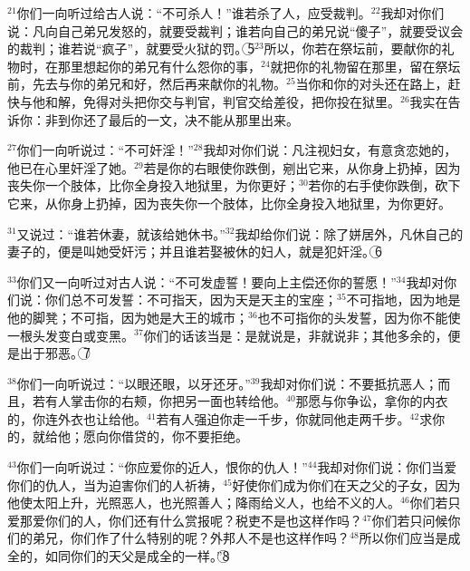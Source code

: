$^{21}$你们一向听过给古人说：“不可杀人！”谁若杀了人，应受裁判。$^{22}$我却对你们说：凡向自己弟兄发怒的，就要受裁判；谁若向自己的弟兄说“傻子”，就要受议会的裁判；谁若说“疯子”，就要受火狱的罚。\textcircled{5}$^{23}$所以，你若在祭坛前，要献你的礼物时，在那里想起你的弟兄有什么怨你的事，$^{24}$就把你的礼物留在那里，留在祭坛前，先去与你的弟兄和好，然后再来献你的礼物。$^{25}$当你和你的对头还在路上，赶快与他和解，免得对头把你交与判官，判官交给差役，把你投在狱里。$^{26}$我实在告诉你：非到你还了最后的一文，决不能从那里出来。

$^{27}$你们一向听说过：“不可奸淫！”$^{28}$我却对你们说：凡注视妇女，有意贪恋她的，他已在心里奸淫了她。$^{29}$若是你的右眼使你跌倒，剜出它来，从你身上扔掉，因为丧失你一个肢体，比你全身投入地狱里，为你更好；$^{30}$若你的右手使你跌倒，砍下它来，从你身上扔掉，因为丧失你一个肢体，比你全身投入地狱里，为你更好。

$^{31}$又说过：“谁若休妻，就该给她休书。”$^{32}$我却给你们说：除了姘居外，凡休自己的妻子的，便是叫她受奸污；并且谁若娶被休的妇人，就是犯奸淫。\textcircled{6}

$^{33}$你们又一向听过对古人说：“不可发虚誓！要向上主偿还你的誓愿！”$^{34}$我却对你们说：你们总不可发誓：不可指天，因为天是天主的宝座；$^{35}$不可指地，因为地是他的脚凳；不可指\UL[耶路撒冷]，因为她是大王的城市；$^{36}$也不可指你的头发誓，因为你不能使一根头发变白或变黑。$^{37}$你们的话该当是：是就说是，非就说非；其他多余的，便是出于邪恶。\textcircled{7}

$^{38}$你们一向听说过：“以眼还眼，以牙还牙。”$^{39}$我却对你们说：不要抵抗恶人；而且，若有人掌击你的右颊，你把另一面也转给他。$^{40}$那愿与你争讼，拿你的内衣的，你连外衣也让给他。$^{41}$若有人强迫你走一千步，你就同他走两千步。$^{42}$求你的，就给他；愿向你借贷的，你不要拒绝。

$^{43}$你们一向听说过：“你应爱你的近人，恨你的仇人！”$^{44}$我却对你们说：你们当爱你们的仇人，当为迫害你们的人祈祷，$^{45}$好使你们成为你们在天之父的子女，因为他使太阳上升，光照恶人，也光照善人；降雨给义人，也给不义的人。$^{46}$你们若只爱那爱你们的人，你们还有什么赏报呢？税吏不是也这样作吗？$^{47}$你们若只问候你们的弟兄，你们作了什么特别的呢？外邦人不是也这样作吗？$^{48}$所以你们应当是成全的，如同你们的天父是成全的一样。”\textcircled{8}



